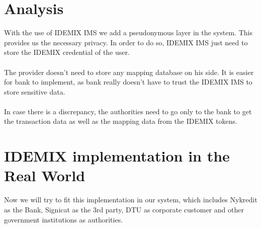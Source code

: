 \section{Analysis}
With the use of IDEMIX IMS we add a pseudonymous layer in the system. This provides us the necessary privacy. In order to do so, IDEMIX IMS just need to store the IDEMIX credential of the user. 
\\
\\The provider doesn’t need to store any mapping database on his side. It is easier for bank to implement, as bank really doesn’t have to trust the IDEMIX IMS to store sensitive data.
\\
\\In case there is a discrepancy, the authorities need to go only to the bank to get the transaction data as well as the mapping data from the IDEMIX tokens.
\section {IDEMIX implementation in the Real World}
Now we will try to fit this implementation in our system, which includes Nykredit as the Bank, Signicat as the 3rd party, DTU as corporate customer and other government institutions as authorities.
